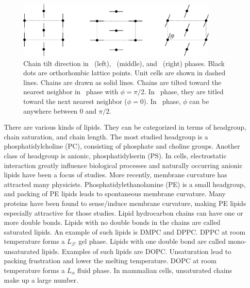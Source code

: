 \begin{figure}[htbp]
  \centering
  \includegraphics[width=0.9\textwidth]{figures/gel_phase_packing}
  \caption{Chain tilt direction in \LbetaI\ (left), \LbetaF\ (middle), and
  \LbetaL\ (right) phases. Black dots are orthorhombic lattice points.
  Unit cells are shown in dashed lines.
  Chains are drawn as solid lines. Chains are tilted toward the
  nearest neighbor in \LbetaI\ phase with $\phi=\pi/2$. 
  In \LbetaF\ phase, they are titled toward the next nearest neighbor
  ($\phi=0$). In \LbetaL\ phase, $\phi$ can be anywhere between 0 and $\pi/2$.}
  \label{fig:gel_phase_packing}
\end{figure}

There are various kinds of lipids. They can be 
categorized in terms of headgroup, chain saturation, and chain length.
The most studied headgroup is a phosphatidylcholine (PC),
consisting of phosphate and choline groups. Another class of headgroup is
anionic, phosphatidylserin (PS). In cells, electrostatic interaction 
greatly influence biological processes and naturally occurring anionic
lipids have been a focus of studies. More recently, membrane curvature
has attracted many physicists. Phosphatidylethanolamine (PE) is a small 
headgroup, and packing of PE lipids leads to spontaneous membrane curvature.
Many proteins have been found to sense/induce membrane curvature, 
making PE lipids especially attractive for those studies.
Lipid hydrocarbon chains can have one or more double bonds. Lipids
with no double bonds in the chains are called saturated lipids.
An example of such lipids is DMPC and DPPC. DPPC at room temperature
forms a $L_{\beta'}$ gel phase.
Lipids with one double bond
are called mono-unsaturated lipids. Examples of such lipids are DOPC.
Unsaturation lead to packing frustration and lower the melting 
temperature. DOPC at room temperature forms a $L_{\alpha}$ fluid phase.
In mammalian cells, unsaturated chains make up a large number.

